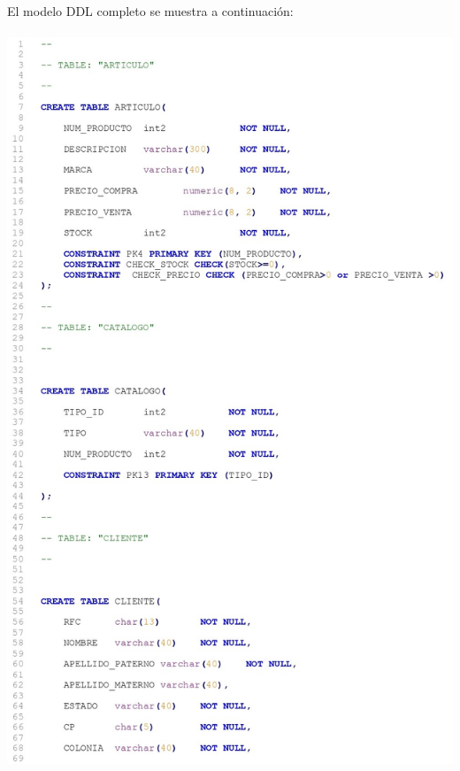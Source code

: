 \documentclass[letter,12pt]{article} %
\begin{document}
\newpage
El modelo DDL completo se muestra a continuación:
\\\\
\includegraphics[scale=0.81]{imagenes/DDL1.jpg}
\newpage
\end{document}
